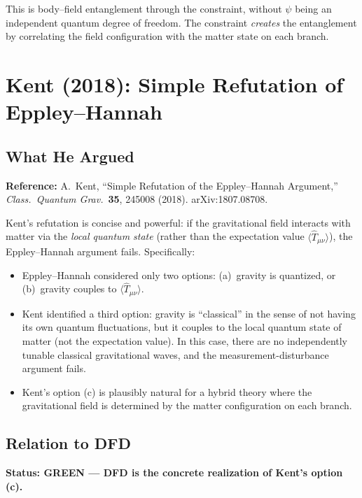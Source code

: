 \documentclass[12pt,a4paper]{article}
\newcommand{\GREEN}{\textcolor{dfdgreen}{\textbf{GREEN}}}
\begin{document}
This is body--field entanglement through the constraint, without $\psi$ being an independent quantum degree of freedom. The constraint \emph{creates} the entanglement by correlating the field configuration with the matter state on each branch.


\section{Kent (2018): Simple Refutation of Eppley--Hannah}
\label{sec:kent}

\subsection{What He Argued}

\textbf{Reference:} A.\ Kent, ``Simple Refutation of the Eppley--Hannah Argument,'' \textit{Class.\ Quantum Grav.}\ \textbf{35}, 245008 (2018). arXiv:1807.08708.

Kent's refutation is concise and powerful: if the gravitational field interacts with matter via the \emph{local quantum state} (rather than the expectation value $\langle\hat{T}_{\mu\nu}\rangle$), the Eppley--Hannah argument fails. Specifically:

\begin{itemize}
\item Eppley--Hannah considered only two options: (a)~gravity is quantized, or (b)~gravity couples to $\langle\hat{T}_{\mu\nu}\rangle$.
\item Kent identified a third option: gravity is ``classical'' in the sense of not having its own quantum fluctuations, but it couples to the local quantum state of matter (not the expectation value). In this case, there are no independently tunable classical gravitational waves, and the measurement-disturbance argument fails.
\item Kent's option (c) is plausibly natural for a hybrid theory where the gravitational field is determined by the matter configuration on each branch.
\end{itemize}

\subsection{Relation to DFD}

\textbf{Status: \GREEN{} --- DFD is the concrete realization of Kent's option (c).}
\end{document}
